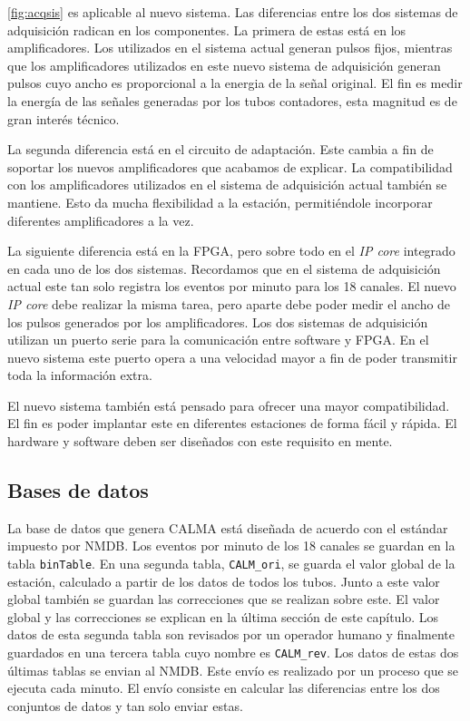 		\ref{fig:acqsis} es aplicable al nuevo sistema. Las diferencias entre los dos sistemas de adquisición radican en los componentes. La
		primera de estas está en los amplificadores. Los utilizados en el sistema actual generan pulsos fijos, mientras que los amplificadores
		utilizados en este nuevo sistema de adquisición generan pulsos cuyo ancho es proporcional a la energia de la señal original. El fin es
		medir la energía de las señales generadas por los tubos contadores, esta magnitud es de gran interés técnico.
		\par
		La segunda diferencia está en el circuito de adaptación. Este cambia a fin de soportar los nuevos amplificadores que acabamos de
		explicar. La compatibilidad con los amplificadores utilizados en el sistema de adquisición actual también se mantiene. Esto da mucha
		flexibilidad a la estación, permitiéndole incorporar diferentes amplificadores a la vez.
		\par
		La siguiente diferencia está en la FPGA, pero sobre todo en el \emph{IP core} integrado en cada uno de los dos sistemas. Recordamos
		que en el sistema de adquisición actual este tan solo registra los eventos por minuto para los 18 canales. El nuevo \emph{IP core}
		debe realizar la misma tarea, pero aparte debe poder medir el ancho de los pulsos generados por los amplificadores. Los dos sistemas
		de adquisición utilizan un puerto serie para la comunicación entre software y FPGA. En el nuevo sistema este puerto opera a una
		velocidad mayor a fin de poder transmitir toda la información extra.
		\par
		El nuevo sistema también está pensado para ofrecer una mayor compatibilidad. El fin es poder implantar este en diferentes estaciones
		de forma fácil y rápida. El hardware y software deben ser diseñados con este requisito en mente.
	\subsection{Bases de datos}
		La base de datos que genera CALMA está diseñada de acuerdo con el estándar impuesto por NMDB. Los eventos por minuto de los 18 canales
		se guardan en la tabla \texttt{binTable}. En una segunda tabla, \texttt{CALM\_ori}, se guarda el valor global de la estación, calculado
		a partir de los datos de todos los tubos. Junto a este valor global también se guardan las correcciones que se realizan sobre este. El
		valor global y las correcciones se explican en la última sección de este capítulo. Los datos de esta segunda tabla son revisados
		por un operador humano y finalmente guardados en una tercera tabla cuyo nombre es \texttt{CALM\_rev}. Los datos de estas dos últimas
		tablas se envian al NMDB. Este envío es realizado por un proceso que se ejecuta cada minuto. El envío consiste en calcular las
		diferencias entre los dos conjuntos de datos y tan solo enviar estas.

